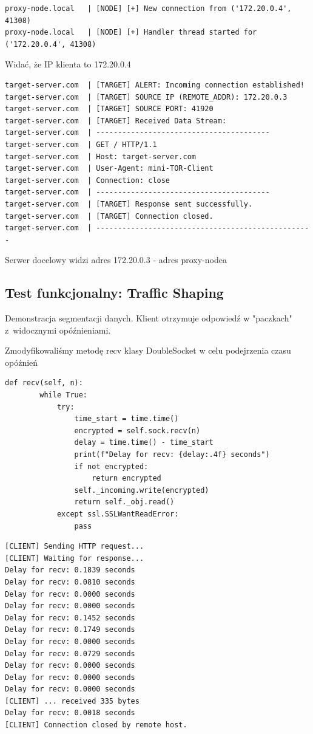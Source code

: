 \documentclass[12pt, a4paper]{article}
\begin{document}
\begin{lstlisting}[caption=Logi z proxy-nodea]
proxy-node.local   | [NODE] [+] New connection from ('172.20.0.4', 41308)
proxy-node.local   | [NODE] [+] Handler thread started for ('172.20.0.4', 41308)
\end{lstlisting}

Widać, że IP klienta to 172.20.0.4

\begin{lstlisting}[caption=Logi serwera docelowego]
target-server.com  | [TARGET] ALERT: Incoming connection established!
target-server.com  | [TARGET] SOURCE IP (REMOTE_ADDR): 172.20.0.3
target-server.com  | [TARGET] SOURCE PORT: 41920
target-server.com  | [TARGET] Received Data Stream:
target-server.com  | ----------------------------------------
target-server.com  | GET / HTTP/1.1
target-server.com  | Host: target-server.com
target-server.com  | User-Agent: mini-TOR-Client
target-server.com  | Connection: close
target-server.com  | ----------------------------------------
target-server.com  | [TARGET] Response sent successfully.
target-server.com  | [TARGET] Connection closed.
target-server.com  | --------------------------------------------------
\end{lstlisting}

Serwer docelowy widzi adres 172.20.0.3 - adres proxy-nodea

\subsection{Test funkcjonalny: Traffic Shaping}
Demonstracja segmentacji danych. Klient otrzymuje odpowiedź w "paczkach" z~widocznymi opóźnieniami.

Zmodyfikowaliśmy metodę recv klasy DoubleSocket w celu podejrzenia czasu opóźnień

\begin{lstlisting}[caption=Modyfikacja metody]
    def recv(self, n):
        while True:
            try:
                time_start = time.time()
                encrypted = self.sock.recv(n)
                delay = time.time() - time_start
                print(f"Delay for recv: {delay:.4f} seconds")
                if not encrypted:
                    return encrypted
                self._incoming.write(encrypted)
                return self._obj.read()
            except ssl.SSLWantReadError:
                pass

\end{lstlisting}

\begin{lstlisting}[caption=Logi klienta demonstracyjnego (Segmentacja)]
[CLIENT] Sending HTTP request...
[CLIENT] Waiting for response...
Delay for recv: 0.1839 seconds
Delay for recv: 0.0810 seconds
Delay for recv: 0.0000 seconds
Delay for recv: 0.0000 seconds
Delay for recv: 0.1452 seconds
Delay for recv: 0.1749 seconds
Delay for recv: 0.0000 seconds
Delay for recv: 0.0729 seconds
Delay for recv: 0.0000 seconds
Delay for recv: 0.0000 seconds
Delay for recv: 0.0000 seconds
[CLIENT] ... received 335 bytes
Delay for recv: 0.0018 seconds
[CLIENT] Connection closed by remote host.
\end{lstlisting}
\end{document}
